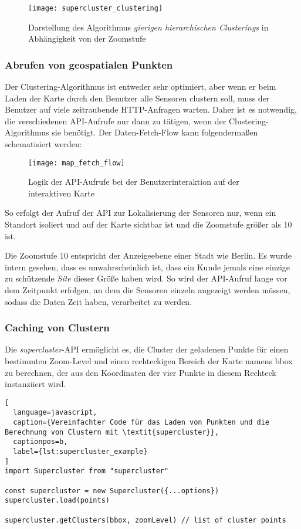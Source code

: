 \begin{figure}[H]
  \centering
  \texttt{[image: supercluster\_clustering]}
  \caption{Darstellung des Algorithmus \textit{gierigen hierarchischen Clusterings} in Abhängigkeit von der Zoomstufe}
  \label{fig:supercluster_clustering}
\end{figure}

\subsubsection{Abrufen von geospatialen Punkten}

Der Clustering-Algorithmus ist entweder sehr optimiert, aber wenn er beim Laden der Karte durch den Benutzer alle Sensoren clustern soll, muss der Benutzer auf viele zeitraubende \ac{HTTP}-Anfragen warten.
Daher ist es notwendig, die verschiedenen API-Aufrufe nur dann zu tätigen, wenn der Clustering-Algorithmus sie benötigt.
Der Daten-Fetch-Flow kann folgendermaßen schematisiert werden:

\begin{figure}[H]
  \centering
  \texttt{[image: map\_fetch\_flow]}
  \caption{Logik der API-Aufrufe bei der Benutzerinteraktion auf der interaktiven Karte}
  \label{fig:map_fetch_flow}
\end{figure}

So erfolgt der Aufruf der API zur Lokalisierung der Sensoren nur, wenn ein Standort isoliert und auf der Karte sichtbar ist und die Zoomstufe größer als 10 ist.

Die Zoomstufe 10 entspricht der Anzeigeebene einer Stadt wie Berlin.
Es wurde intern gesehen, dass es unwahrscheinlich ist, dass ein Kunde jemals eine einzige zu schützende \textit{Site} dieser Größe haben wird.
So wird der API-Aufruf lange vor dem Zeitpunkt erfolgen, an dem die Sensoren einzeln angezeigt werden müssen, sodass die Daten Zeit haben, verarbeitet zu werden.

\subsubsection{Caching von Clustern}

Die \textit{supercluster}-API ermöglicht es, die Cluster der geladenen Punkte für einen bestimmten Zoom-Level und einen rechteckigen Bereich der Karte namens bbox zu berechnen, der aus den Koordinaten der vier Punkte in diesem Rechteck instanziiert wird.

\begin{lstlisting}[
  language=javascript,
  caption={Vereinfachter Code für das Laden von Punkten und die Berechnung von Clustern mit \textit{supercluster}},
  captionpos=b,
  label={lst:supercluster_example}
]
import Supercluster from "supercluster"

const supercluster = new Supercluster({...options})
supercluster.load(points)

supercluster.getClusters(bbox, zoomLevel) // list of cluster points
\end{lstlisting}

